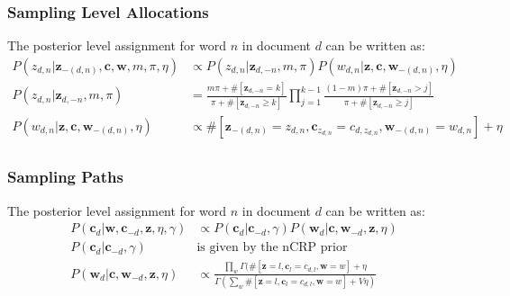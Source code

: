 \documentclass{article}
\begin{document}
\subsubsection*{Sampling Level Allocations}
The posterior level assignment for word $n$ in document $d$ can be written as:
\begin{equation}
\begin{split}
  P(z_{d,n} | \mathbf{z}_{-(d,n)}, \mathbf{c}, \mathbf{w}, m, \pi, \eta) & \propto P(z_{d,n} | \mathbf{z}_{d, -n}, m, \pi) P(w_{d,n} | \mathbf{z}, \mathbf{c}, \mathbf{w}_{-(d,n)}, \eta) \\
P(z_{d,n} | \mathbf{z}_{d, -n}, m, \pi) & = \frac{m\pi + \#[\mathbf{z}_{d, -n} = k]}{\pi + \#[\mathbf{z}_{d, -n} \geq k]} \prod_{j = 1}^{k-1} \frac{(1-m)\pi + \#[\mathbf{z}_{d, -n} > j]}{\pi + \#[\mathbf{z}_{d, -n} \geq j]} \\
  P(w_{d,n} | \mathbf{z}, \mathbf{c}, \mathbf{w}_{-(d,n)}, \eta) & \propto \#[\mathbf{z}_{-(d,n)} = z_{d,n}, \mathbf{c}_{z_{d,n}} = c_{d,z_{d,n}}, \mathbf{w}_{-(d,n)} = w_{d,n}] + 
  \eta\\
\end{split}
\label{eq2}
\end{equation}

\subsubsection*{Sampling Paths}
The posterior level assignment for word $n$ in document $d$ can be written as:
\begin{equation}
\begin{split}
  P(\mathbf{c}_d | \mathbf{w}, \mathbf{c}_{-d}, \mathbf{z}, \eta, \gamma) & \propto P(\mathbf{c}_{d} | \mathbf{c}_{-d}, \gamma) P(\mathbf{w}_{d} | \mathbf{c}, \mathbf{w}_{-d}, \mathbf{z},\eta) \\
  P(\mathbf{c}_{d} | \mathbf{c}_{-d}, \gamma)  & \text{is given by the nCRP prior} \\
  P(\mathbf{w}_{d} | \mathbf{c}, \mathbf{w}_{-d}, \mathbf{z},\eta) & \propto \frac{\prod_w \Gamma (\#[\mathbf{z} = l, \mathbf{c}_{l} = c_{d,l}, \mathbf{w} = w] + \eta}{\Gamma (\sum_w \#[\mathbf{z} = l, \mathbf{c}_{l} = c_{d,l}, \mathbf{w} = w] + V\eta)}\\
\end{split}
\label{eq1}
\end{equation}
\end{document}

